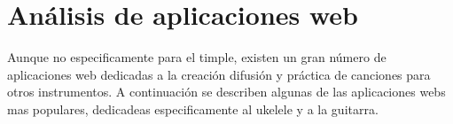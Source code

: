 \section{Análisis de aplicaciones web}
Aunque no especificamente para el timple, existen un gran número de aplicaciones web dedicadas a la creación difusión y práctica de canciones para otros instrumentos. A continuación se describen algunas de las aplicaciones webs mas populares, dedicadeas especificamente al ukelele y a la guitarra.




